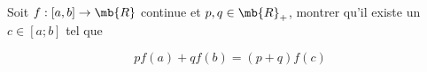 \exercice

Soit $f : [a,b] \to \mb{R}$ continue et $p,q \in \mb{R}_+$, montrer 
qu'il existe un $c \in [a;b]$ tel que 

\begin{equation*}
    p f(a) + q f(b) = (p + q) f (c)
\end{equation*}



